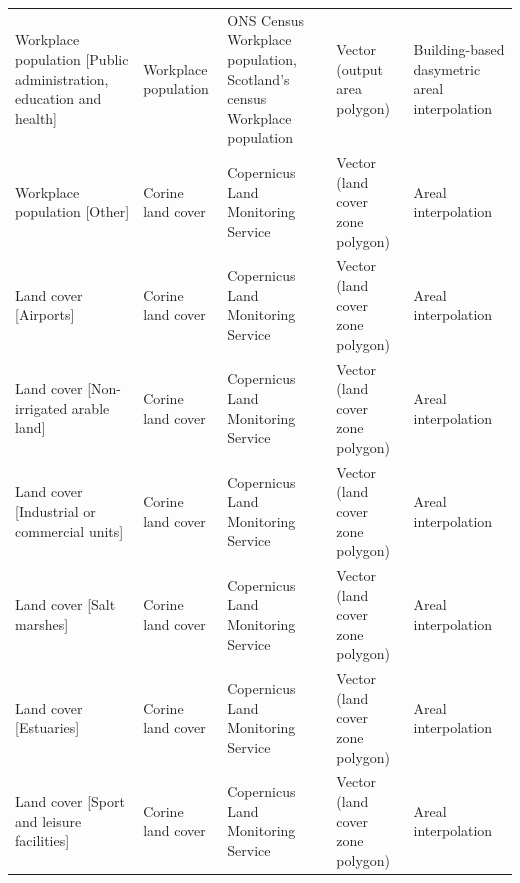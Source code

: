 \documentclass[fleqn,10pt]{wlscirep}
\begin{document}
\begin{longtable}{p{}p{}p{}p{}p{}}
                                        Workplace population [Public administration, education and health] &               Workplace population  &    ONS Census Workplace population, Scotland's census Workplace population  &      Vector (output area polygon)  &  Building-based dasymetric areal interpolation  \\
                                                                            Workplace population [Other] &                  Corine land cover  &                                         Copernicus Land Monitoring Service  &  Vector (land cover zone polygon)  &                            Areal interpolation  \\
                                                                                    Land cover [Airports] &                  Corine land cover  &                                         Copernicus Land Monitoring Service  &  Vector (land cover zone polygon)  &                            Areal interpolation  \\
                                                                    Land cover [Non-irrigated arable land] &                  Corine land cover  &                                         Copernicus Land Monitoring Service  &  Vector (land cover zone polygon)  &                            Areal interpolation  \\
                                                            Land cover [Industrial or commercial units] &                  Corine land cover  &                                         Copernicus Land Monitoring Service  &  Vector (land cover zone polygon)  &                            Areal interpolation  \\
                                                                                Land cover [Salt marshes] &                  Corine land cover  &                                         Copernicus Land Monitoring Service  &  Vector (land cover zone polygon)  &                            Areal interpolation  \\
                                                                                    Land cover [Estuaries] &                  Corine land cover  &                                         Copernicus Land Monitoring Service  &  Vector (land cover zone polygon)  &                            Areal interpolation  \\
                                                                Land cover [Sport and leisure facilities] &                  Corine land cover  &                                         Copernicus Land Monitoring Service  &  Vector (land cover zone polygon)  &                            Areal interpolation  \\

\end{longtable}
\end{document}
